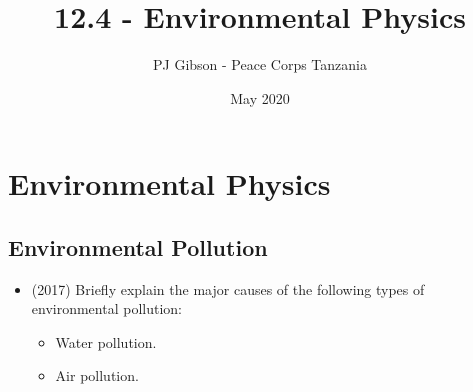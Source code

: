 \documentclass{article}
\title{12.4 - Environmental Physics}
\author{PJ Gibson - Peace Corps Tanzania}
\date{May 2020}
\begin{document}
\maketitle


\section{Environmental Physics}

\subsection{Environmental Pollution}
\begin{itemize}
\item (2017)  Briefly explain the major causes of the following types of environmental pollution:
 \begin{itemize}
\item Water pollution. 
\item  Air pollution.
\end{itemize}
\end{itemize}
\end{document}
